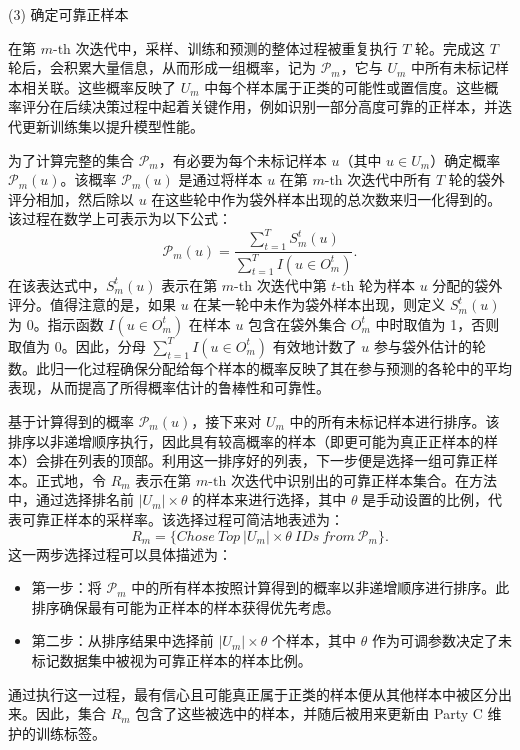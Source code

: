 (3) 确定可靠正样本

在第 $m\text{-th}$ 次迭代中，采样、训练和预测的整体过程被重复执行 $T$ 轮。完成这 $T$ 轮后，会积累大量信息，从而形成一组概率，记为 ${{\mathsf{\mathcal{P}}}_{m}}$，它与 ${{U}_{m}}$ 中所有未标记样本相关联。这些概率反映了 ${{U}_{m}}$ 中每个样本属于正类的可能性或置信度。这些概率评分在后续决策过程中起着关键作用，例如识别一部分高度可靠的正样本，并迭代更新训练集以提升模型性能。

为了计算完整的集合 ${{\mathsf{\mathcal{P}}}_{m}}$，有必要为每个未标记样本 $u$（其中 $u\in {{U}_{m}}$）确定概率 ${{\mathsf{\mathcal{P}}}_{m}}(u)$。该概率 ${{\mathsf{\mathcal{P}}}_{m}}(u)$ 是通过将样本 $u$ 在第 $m\text{-th}$ 次迭代中所有 $T$ 轮的袋外评分相加，然后除以 $u$ 在这些轮中作为袋外样本出现的总次数来归一化得到的。该过程在数学上可表示为以下公式：
\begin{equation}
	{{\mathsf{\mathcal{P}}}_{m}}(u)=\frac{\sum\nolimits_{t=1}^{T}{S_{m}^{t}}(u)}{\sum\nolimits_{t=1}^{T}{I(u\in O_{m}^{t})}}.
\end{equation}
在该表达式中，$S_{m}^{t}(u)$ 表示在第 $m\text{-th}$ 次迭代中第 $t\text{-th}$ 轮为样本 $u$ 分配的袋外评分。值得注意的是，如果 $u$ 在某一轮中未作为袋外样本出现，则定义 $S_{m}^{t}(u)$ 为 0。指示函数 $I(u\in O_{m}^{t})$ 在样本 $u$ 包含在袋外集合 $O_{m}^{t}$ 中时取值为 1，否则取值为 0。因此，分母 $\sum\nolimits_{t=1}^{T}{I(u\in O_{m}^{t})}$ 有效地计数了 $u$ 参与袋外估计的轮数。此归一化过程确保分配给每个样本的概率反映了其在参与预测的各轮中的平均表现，从而提高了所得概率估计的鲁棒性和可靠性。

基于计算得到的概率 ${{\mathsf{\mathcal{P}}}_{m}}(u)$，接下来对 ${{U}_{m}}$ 中的所有未标记样本进行排序。该排序以非递增顺序执行，因此具有较高概率的样本（即更可能为真正正样本的样本）会排在列表的顶部。利用这一排序好的列表，下一步便是选择一组可靠正样本。正式地，令 ${{R}_{m}}$ 表示在第 $m\text{-th}$ 次迭代中识别出的可靠正样本集合。在方法中，通过选择排名前 $|{{U}_{m}}|\times \theta$ 的样本来进行选择，其中 $\theta$ 是手动设置的比例，代表可靠正样本的采样率。该选择过程可简洁地表述为：
\begin{equation}
	{{R}_{m}}=\{Chose\ Top\ |{{U}_{m}}|\times \theta \ IDs\ from\ {{\mathsf{\mathcal{P}}}_{m}}\}.
\end{equation}
这一两步选择过程可以具体描述为：
\begin{itemize}
	\item 第一步：将 ${{\mathsf{\mathcal{P}}}_{m}}$ 中的所有样本按照计算得到的概率以非递增顺序进行排序。此排序确保最有可能为正样本的样本获得优先考虑。
	
	\item 第二步：从排序结果中选择前 $|{{U}_{m}}|\times \theta$ 个样本，其中 $\theta$ 作为可调参数决定了未标记数据集中被视为可靠正样本的样本比例。
\end{itemize}
通过执行这一过程，最有信心且可能真正属于正类的样本便从其他样本中被区分出来。因此，集合 ${{R}_{m}}$ 包含了这些被选中的样本，并随后被用来更新由 Party C 维护的训练标签。


